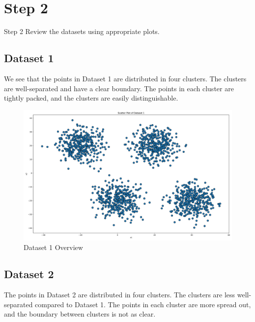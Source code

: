 \section*{Step 2}

\begin{custombox}[label={box:Q2}]{Step 2}
	Review the datasets using appropriate plots.
\end{custombox}

\vspace{10mm}

\subsection*{Dataset 1}

We see that the points in Dataset 1 are distributed in four clusters. The clusters are well-separated and have a clear boundary. The points in each cluster are tightly packed, and the clusters are easily distinguishable.

\vspace{10mm}

\begin{figure}[H]
	\centering
	\includegraphics[width=0.8\linewidth]{Images/dataset-1-overview.png}
	\caption{Dataset 1 Overview}
	\label{fig:dataset-1-overview}
\end{figure}

\vspace{10mm}

\subsection*{Dataset 2}

The points in Dataset 2 are distributed in four clusters. The clusters are less well-separated compared to Dataset 1. The points in each cluster are more spread out, and the boundary between clusters is not as clear.

